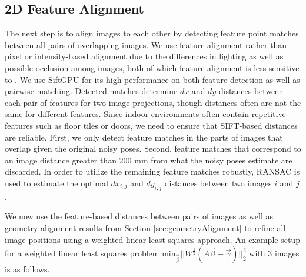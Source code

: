 \documentclass{llncs}
\begin{document}
\subsection{2D Feature Alignment}
\label{sec:robustSIFTFeatureMatching}
The next step is to align images to each other by detecting feature
point matches between all pairs of overlapping images. We use feature
alignment rather than pixel or intensity-based alignment due to the
differences in lighting as well as possible occlusion among images,
both of which feature alignment is less sensitive to
\cite{lowe1999object, mikolajczyk2005performance,
  szeliski2006image}. We use SiftGPU \cite{siftgpu} for its high
performance on both feature detection as well as pairwise
matching. Detected matches determine $dx$ and $dy$ distances between
each pair of features for two image projections, though distances
often are not the same for different features. Since indoor
environments often contain repetitive features such as floor tiles or
doors, we need to ensure that SIFT-based distances are
reliable. First, we only detect feature matches in the parts of images
that overlap given the original noisy poses. Second, feature matches
that correspond to an image distance greater than 200 mm from what the
noisy poses estimate are discarded. In order to utilize the remaining
feature matches robustly, RANSAC \cite{fischler1981random} is used to
estimate the optimal $dx_{i,j}$ and $dy_{i,j}$ distances between two
images $i$ and $j$.

We now use the feature-based distances between pairs of images as well
as geometry alignment results from Section \ref{sec:geometryAlignment}
to refine all image positions using a weighted linear least squares
approach. An example setup for a weighted linear least squares problem
$\textrm{min}_{\vec{\beta}} ||W^\frac{1}{2}(A \vec{\beta} -
\vec{\gamma})||_2^2 $ with 3 images is as follows.
\end{document}
